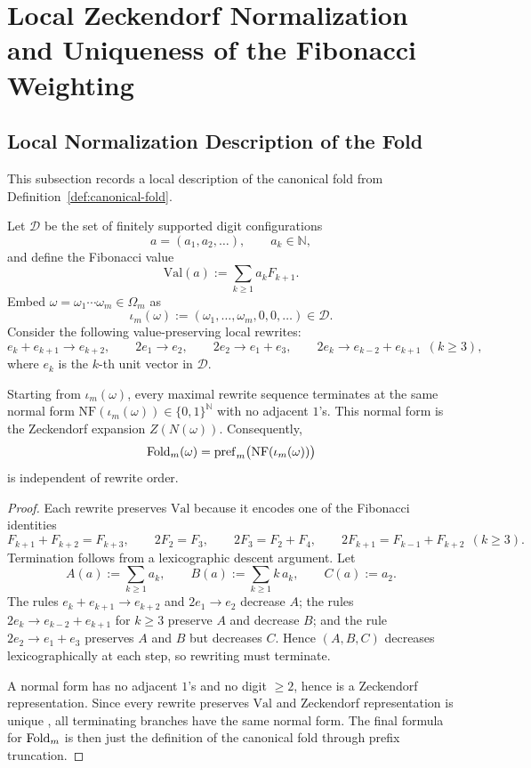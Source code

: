 \section{Local Zeckendorf Normalization and Uniqueness of the Fibonacci Weighting}\label{app:canonical-fold}

\subsection{Local Normalization Description of the Fold}

This subsection records a local description of the canonical fold from
Definition~\ref{def:canonical-fold}.

Let \(\mathcal{D}\) be the set of finitely supported digit configurations
\[
a=(a_1,a_2,\dots),\qquad a_k\in\mathbb{N},
\]
and define the Fibonacci value
\[
\mathrm{Val}(a):=\sum_{k\ge 1} a_k F_{k+1}.
\]
Embed \(\omega=\omega_1\cdots \omega_m\in\Omega_m\) as
\[
\iota_m(\omega):=(\omega_1,\dots,\omega_m,0,0,\dots)\in\mathcal{D}.
\]
Consider the following value-preserving local rewrites:
\[
e_k+e_{k+1}\to e_{k+2},
\qquad
2e_1\to e_2,
\qquad
2e_2\to e_1+e_3,
\qquad
2e_k\to e_{k-2}+e_{k+1}\ \ (k\ge 3),
\]
where \(e_k\) is the \(k\)-th unit vector in \(\mathcal{D}\).

\begin{proposition}\label{prop:canonical-fold-rewrite}
Starting from \(\iota_m(\omega)\), every maximal rewrite sequence terminates at
the same normal form \(\mathrm{NF}(\iota_m(\omega))\in\{0,1\}^{\mathbb{N}}\)
with no adjacent \(1\)'s. This normal form is the Zeckendorf expansion
\(Z(N(\omega))\). Consequently,
\[
\mathrm{Fold}_m(\omega)=\mathrm{pref}_m\bigl(\mathrm{NF}(\iota_m(\omega))\bigr)
\]
is independent of rewrite order.
\end{proposition}

\begin{proof}
Each rewrite preserves \(\mathrm{Val}\) because it encodes one of the Fibonacci
identities
\[
F_{k+1}+F_{k+2}=F_{k+3},
\qquad
2F_2=F_3,
\qquad
2F_3=F_2+F_4,
\qquad
2F_{k+1}=F_{k-1}+F_{k+2}\ \ (k\ge 3).
\]
Termination follows from a lexicographic descent argument. Let
\[
A(a):=\sum_{k\ge 1} a_k,
\qquad
B(a):=\sum_{k\ge 1} k\,a_k,
\qquad
C(a):=a_2.
\]
The rules \(e_k+e_{k+1}\to e_{k+2}\) and \(2e_1\to e_2\) decrease \(A\); the
rules \(2e_k\to e_{k-2}+e_{k+1}\) for \(k\ge 3\) preserve \(A\) and decrease
\(B\); and the rule \(2e_2\to e_1+e_3\) preserves \(A\) and \(B\) but decreases
\(C\). Hence \((A,B,C)\) decreases lexicographically at each step, so rewriting
must terminate.

A normal form has no adjacent \(1\)'s and no digit \(\ge 2\), hence is a
Zeckendorf representation. Since every rewrite preserves \(\mathrm{Val}\) and
Zeckendorf representation is unique \cite{Zeckendorf1972}, all terminating
branches have the same normal form. The final formula for \(\mathrm{Fold}_m\) is then
just the definition of the canonical fold through prefix truncation.
\end{proof}

